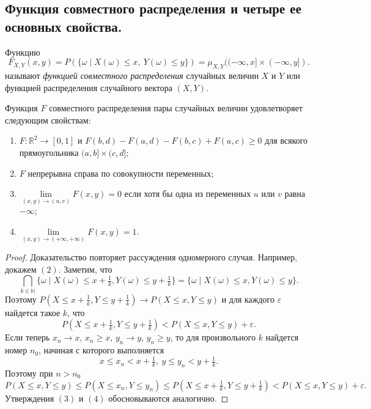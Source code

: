 \sectionbreak
\subsection{Функция совместного распределения и четыре ее основных свойства.}

\begin{definition}
Функцию
\[
    F_{X, Y}(x, y) = P(\{\omega \mid X(\omega) \leqslant x,~ Y(\omega) \leqslant y\}) = \mu_{X, Y}((-\infty, x] \times (-\infty, y]).
\]
называют {\it функцией совместного распределения} случайных величин $X$ и $Y$ или функцией распределения случайного вектора $(X, Y)$.
\end{definition}

\begin{proposal*}
    Функция $F$ совместного распределения пары случайных величин удовлетворяет следующим свойствам:
    \begin{enumerate}
        \item $F \colon \mathbb{R}^2 \to [0, 1]$ и $F(b, d) - F(a, d) - F(b, c) + F(a, c) \geqslant 0$ для всякого прямоугольника $(a, b] \times (c, d]$;
        \item $F$ непрерывна справа по совокупности переменных;
        \item $\lim\limits_{(x, y) \to (u, v)} F(x, y) = 0$ если хотя бы одна из переменных $u$ или $v$ равна $-\infty$;
        \item $\lim\limits_{(x, y) \to (+\infty, +\infty)} F(x, y) = 1$.
    \end{enumerate}
\end{proposal*}
\begin{proof}
    Доказательство повторяет рассуждения одномерного случая.
    Например, докажем $(2)$.
    Заметим, что
    \[
        \bigcap\limits_{k \in \mathbb{N}}\{\omega \mid X(\omega) \leqslant x + \tfrac{1}{k}, Y(\omega) \leqslant y + \tfrac{1}{k}\} =
    \{\omega \mid X(\omega) \leqslant x, Y(\omega) \leqslant y\}.
    \]
    Поэтому $P(X \leqslant x + \tfrac{1}{k}, Y \leqslant y + \tfrac{1}{k}) \to P(X \leqslant x, Y \leqslant y)$ и для каждого $\varepsilon$ найдется такое $k$, что
    \[
        P(X \leqslant x + \tfrac{1}{k}, Y \leqslant y + \tfrac{1}{k}) < P(X \leqslant x, Y \leqslant y) + \varepsilon.
    \]
    Если теперь $x_n \to x$, $x_n \geqslant x$, $y_n \to y$, $y_n \geqslant y$, то для произвольного $k$ найдется номер $n_0$, начиная с которого выполняется
    \[
        x \leqslant x_n < x + \tfrac{1}{k},~ y \leqslant y_n < y + \tfrac{1}{k}.
    \]
    Поэтому при $n > n_0$
    \[
        P(X \leqslant x, Y \leqslant y) \leqslant P(X \leqslant x_n, Y \leqslant y_n) \leqslant P(X \leqslant x + \tfrac{1}{k}, Y \leqslant y + \tfrac{1}{k}) < P(X \leqslant x, Y \leqslant y) + \varepsilon.
    \]
    Утверждения $(3)$ и $(4)$ обосновываются аналогично.
\end{proof}

